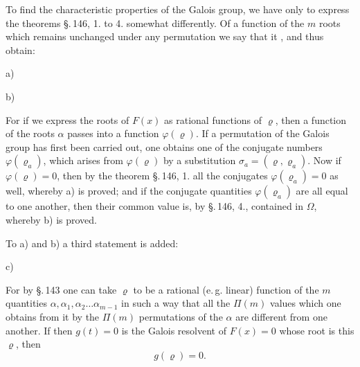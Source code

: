 
To find the characteristic properties of the Galois group, we have only to express the theorems \S.\,146, 1. to 4. somewhat differently. Of a function of the $m$ roots which remains unchanged under any permutation we say that it , and thus obtain:

a) 

b) 

For if we express the roots of $F(x)$ as rational functions of $\varrho$, then a function of the roots $\alpha$ passes into a function $\varphi(\varrho)$. If a permutation of the Galois group has first been carried out, one obtains one of the conjugate numbers $\varphi(\varrho_a)$, which arises from $\varphi(\varrho)$ by a substitution $\sigma_a = (\varrho, \varrho_a)$. Now if $\varphi(\varrho) = 0$, then by the theorem \S.\,146, 1. all the conjugates $\varphi(\varrho_a) = 0$ as well, whereby a) is proved; and if the conjugate quantities $\varphi(\varrho_a)$ are all equal to one another, then their common value is, by \S.\,146, 4., contained in $\Omega$, whereby b) is proved.

To a) and b) a third statement is added:

c) 

For by \S.\,143 one can take $\varrho$ to be a rational (e.\,g. linear) function of the $m$ quantities $\alpha, \alpha_1, \alpha_2 \ldots \alpha_{m-1}$ in such a way that all the $\Pi(m)$ values which one obtains from it by the $\Pi(m)$ permutations of the $\alpha$ are different from one another. If then $g(t) = 0$ is the Galois resolvent of $F(x) = 0$ whose root is this $\varrho$, then
\[
g(\varrho) = 0.
\]
